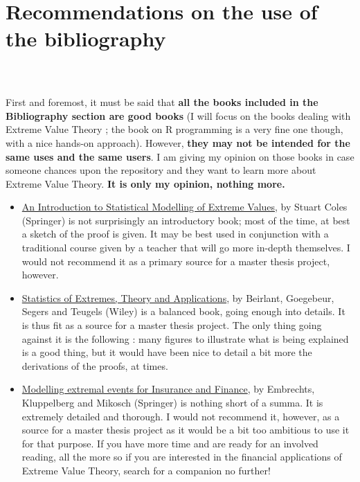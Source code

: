 \appendix
\chapter*{Recommendations on the use of the bibliography}
\paragraph{\\[25 pt]}
First and foremost, it must be said that \textbf{all the books included in the Bibliography section are good books} (I will focus on the books dealing with Extreme Value Theory ; the book on R programming is a very fine one though, with a nice hands-on approach). However, \textbf{they may not be intended for the same uses and the same users}. I am giving my opinion on those books in case someone chances upon the repository and they want to learn more about Extreme Value Theory. \textbf{It is only my opinion, nothing more.}
\begin{itemize}
	\item \underline{An Introduction to Statistical Modelling of Extreme Values}, by Stuart Coles (Springer) is not surprisingly an introductory book; most of the time, at best a sketch of the proof is given. It may be best used in conjunction with a traditional course given by a teacher that will go more in-depth themselves. I would not recommend it as a primary source for a master thesis project, however.
	\item \underline{Statistics of Extremes, Theory and Applications}, by Beirlant, Goegebeur, Segers and Teugels (Wiley) is a balanced book, going enough into details. It is thus fit as a source for a master thesis project. The only thing going against it is the following : many figures to illustrate what is being explained is a good thing, but it would have been nice to detail a bit more the derivations of the proofs, at times.
	\item \underline{Modelling extremal events for Insurance and Finance}, by Embrechts, Kluppelberg and Mikosch (Springer) is nothing short of a summa. It is extremely detailed and thorough. I would not recommend it, however, as a source for a master thesis project as it would be a bit too ambitious to use it for that purpose. If you have more time and are ready for an involved reading, all the more so if you are interested in the financial applications of Extreme Value Theory, search for a companion no further!
\end{itemize}
